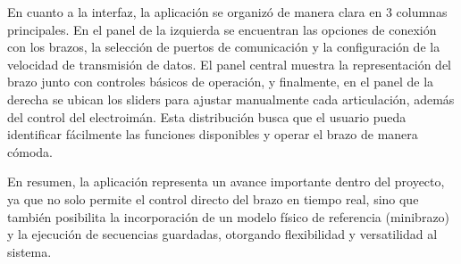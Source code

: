 En cuanto a la interfaz, la aplicación se organizó de manera clara en 3 columnas principales. En el panel de la izquierda se encuentran las opciones de conexión con los brazos, la selección de puertos de comunicación y la configuración de la velocidad de transmisión de datos. El panel central muestra la representación del brazo junto con controles básicos de operación, y finalmente, en el panel de la derecha se ubican los sliders para ajustar manualmente cada articulación, además del control del electroimán. Esta distribución busca que el usuario pueda identificar fácilmente las funciones disponibles y operar el brazo de manera cómoda.

En resumen, la aplicación representa un avance importante dentro del proyecto, ya que no solo permite el control directo del brazo en tiempo real, sino que también posibilita la incorporación de un modelo físico de referencia (minibrazo) y la ejecución de secuencias guardadas, otorgando flexibilidad y versatilidad al sistema.